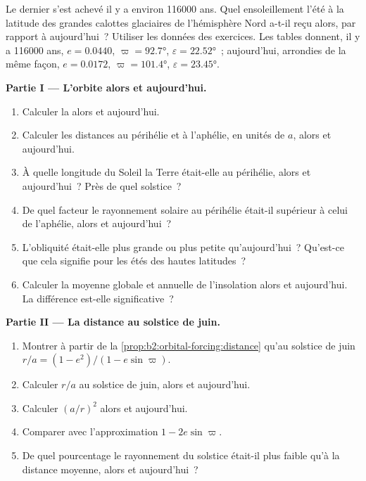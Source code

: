 \begin{problem}\label{pb:b2:orbital-forcing:1}
Le dernier  s'est achevé il y a environ \num{116000} ans. Quel ensoleillement l'été à la latitude des grandes calottes glaciaires de l'hémisphère Nord
a-t-il reçu alors, par rapport à aujourd'hui~? Utiliser les données des exercices.
Les tables donnent, il y a \num{116000} ans, $e = 0.0440$, $\varpi = \ang{92.7}$,
$\varepsilon = \ang{22.52}$~; aujourd'hui, arrondies de la même façon, $e = 0.0172$, $\varpi = \ang{101.4}$,
$\varepsilon = \ang{23.45}$.

\medskip\noindent\textbf{Partie I --- L'orbite alors et aujourd'hui.}
\begin{enumerate}
  \item Calculer la  alors et aujourd'hui.
  \item Calculer les distances au périhélie et à l'aphélie, en unités de $a$, alors et aujourd'hui.
  \item À quelle longitude du Soleil la Terre était-elle au périhélie, alors et aujourd'hui~? Près de quel solstice~?
  \item De quel facteur le rayonnement solaire au périhélie était-il supérieur à celui de l'aphélie, alors et aujourd'hui~?
  \item L'obliquité était-elle plus grande ou plus petite qu'aujourd'hui~? Qu'est-ce que cela signifie pour les étés des
        hautes latitudes~?
  \item Calculer la moyenne globale et annuelle de l'insolation alors et aujourd'hui. La différence est-elle significative~?
\end{enumerate}

\medskip\noindent\textbf{Partie II --- La distance au solstice de juin.}
\begin{enumerate}[resume]
  \item Montrer à partir de la \cref{prop:b2:orbital-forcing:distance} qu'au solstice de juin $r/a = (1 -
        e^2)/(1 - e\sin\varpi)$.
  \item Calculer $r/a$ au solstice de juin, alors et aujourd'hui.
  \item Calculer $(a/r)^2$ alors et aujourd'hui.
  \item Comparer avec l'approximation $1 - 2e\sin\varpi$.
  \item De quel pourcentage le rayonnement du solstice était-il plus faible qu'à la distance moyenne, alors et aujourd'hui~?
\end{enumerate}


\end{problem}
